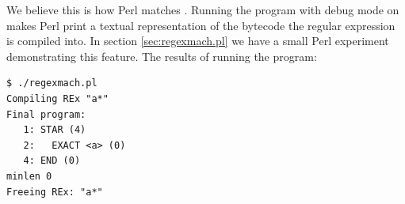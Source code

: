 We believe this is how Perl matches \cite{pelreguts}. Running the
program with debug mode on makes Perl print a textual representation
of the bytecode the regular expression is compiled into. In section
\vref{sec:regexmach.pl} we have a small Perl experiment demonstrating
this feature. The results of running the program:
\begin{verbatim}
$ ./regexmach.pl 
Compiling REx "a*"
Final program:
   1: STAR (4)
   2:   EXACT <a> (0)
   4: END (0)
minlen 0 
Freeing REx: "a*"
\end{verbatim}

